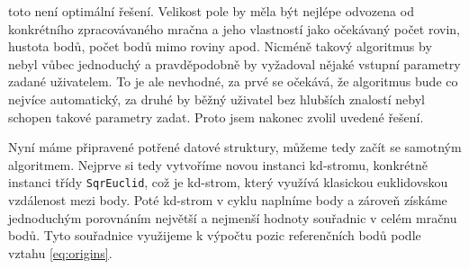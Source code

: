 \documentclass[11pt,twoside,a4paper]{book}
\begin{document}
toto není optimální řešení. Velikost pole by měla být nejlépe odvozena od konkrétního zpracovávaného mračna a jeho vlastností jako očekávaný počet rovin, hustota bodů, počet bodů mimo roviny apod. Nicméně takový algoritmus by nebyl vůbec jednoduchý a pravděpodobně by vyžadoval nějaké vstupní parametry zadané uživatelem. To je ale nevhodné, za prvé se očekává, že algoritmus bude co nejvíce automatický, za druhé by běžný uživatel bez hlubších znalostí nebyl schopen takové parametry zadat. Proto jsem nakonec zvolil uvedené řešení.

Nyní máme připravené potřené datové struktury, můžeme tedy začít se samotným algoritmem. Nejprve si tedy vytvoříme novou instanci kd-stromu, konkrétně instanci třídy \verb|SqrEuclid|, což je kd-strom, který využívá klasickou euklidovskou vzdálenost mezi body. Poté kd-strom  v cyklu naplníme body a zároveň získáme jednoduchým porovnáním  největší a nejmenší hodnoty souřadnic v celém mračnu bodů. Tyto souřadnice využijeme k výpočtu pozic referenčních bodů podle vztahu \ref{eq:origins}.
\end{document}
